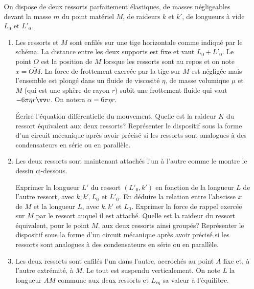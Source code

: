 \begin{exercice}%
  On dispose de deux ressorts parfaitement élastiques, de masses négligeables
  devant la masse \(m\) du point matériel \(M\), de raideurs \(k\) et \(k'\), 
  de
  longueurs à vide \(L_0\) et \(L'_0\).
  \begin{enumerate}
    \item Les ressorts et \(M\) sont enfilés sur une tige horizontale comme
      indiqué par le schéma. La distance entre les deux supports est fixe et
      vaut \(L_0+L'_0\). Le point \(O\) est la position de \(M\) lorsque les
      ressorts sont au repos et on note \(x = \bar{OM}\).
      La force de frottement exercée par la tige sur \(M\) est négligée mais
      l'ensemble est plongé dans un fluide de viscosité \(\eta\), de masse
      volumique \(\mu\) et \(M\) (qui est une sphère de rayon \(r\)) subit une
      frottement fluide qui vaut \(-6\pi\eta r \vvv\). On notera \(\alpha =
      6\pi\eta r\).

      Écrire l'équation différentielle du mouvement. Quelle est la raideur 
      \(K\)
      du ressort équivalent aux deux ressorts? Représenter le dispositif sous 
      la
      forme d'un circuit mécanique après avoir précisé si les ressorts sont
      analogues à des condensateurs en série ou en parallèle.
    \item Les deux ressorts sont maintenant attachés l'un à l'autre comme le
      montre le dessin ci-dessous.

      Exprimer la longueur \(L'\) du ressort \((L'_0, k')\) en fonction de la
      longueur \(L\) de l'autre ressort, avec \(k, k', L_0\) et \(L'_0\). En
      déduire la relation entre l'abscisse \(x\) de \(M\) et la longueur \(L\),
      avec \(k, k'\) et \(L_0\). Exprimer la force de rappel exercée sur \(M\)
      par le ressort auquel il est attaché. Quelle est la raideur du ressort
      équivalent, pour le point \(M\), aux deux ressorts ainsi groupés?
      Représenter le dispositif sous la forme d'un circuit mécanique après 
      avoir
      précisé si les ressorts sont analogues à des condensateurs en série ou en
      parallèle.
    \item Les deux ressorts sont enfilés l'un dans l'autre, accrochés au point
      \(A\) fixe et, à l'autre extrémité, à \(M\). Le tout est suspendu
      verticalement. On note \(L\) la longueur \(AM\) commune aux deux ressorts
      et \(L_{eq}\) sa valeur à l'équilibre.


\end{enumerate}
\end{exercice}
